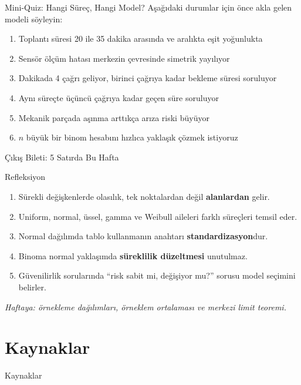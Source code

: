 \documentclass[light]{lutbeamer}
\begin{document}
\begin{frame}{Mini-Quiz: Hangi Süreç, Hangi Model?}
    \small
    Aşağıdaki durumlar için önce akla gelen modeli söyleyin:
    \begin{enumerate}[<+->]
        \item Toplantı süresi 20 ile 35 dakika arasında ve aralıkta eşit yoğunlukta
        \item Sensör ölçüm hatası merkezin çevresinde simetrik yayılıyor
        \item Dakikada 4 çağrı geliyor, birinci çağrıya kadar bekleme süresi soruluyor
        \item Aynı süreçte üçüncü çağrıya kadar geçen süre soruluyor
        \item Mekanik parçada aşınma arttıkça arıza riski büyüyor
        \item \(n\) büyük bir binom hesabını hızlıca yaklaşık çözmek istiyoruz
    \end{enumerate}
\end{frame}

\begin{frame}{Çıkış Bileti: 5 Satırda Bu Hafta}
    \begin{block}{Refleksiyon}
        \begin{enumerate}
            \item Sürekli değişkenlerde olasılık, tek noktalardan değil \textbf{alanlardan} gelir.
            \item Uniform, normal, üssel, gamma ve Weibull aileleri farklı süreçleri temsil eder.
            \item Normal dağılımda tablo kullanmanın anahtarı \textbf{standardizasyon}dur.
            \item Binoma normal yaklaşımda \textbf{süreklilik düzeltmesi} unutulmaz.
            \item Güvenilirlik sorularında ``risk sabit mi, değişiyor mu?'' sorusu model seçimini belirler.
        \end{enumerate}
    \end{block}

    \vspace{0.3cm}
    \centering
    \textit{Haftaya: örnekleme dağılımları, örneklem ortalaması ve merkezi limit teoremi.}
\end{frame}

\section{Kaynaklar}
\begin{frame}[allowframebreaks]{Kaynaklar}
    \nocite{walpole_ch6}
    \printbibliography{}
\end{frame}
\end{document}
